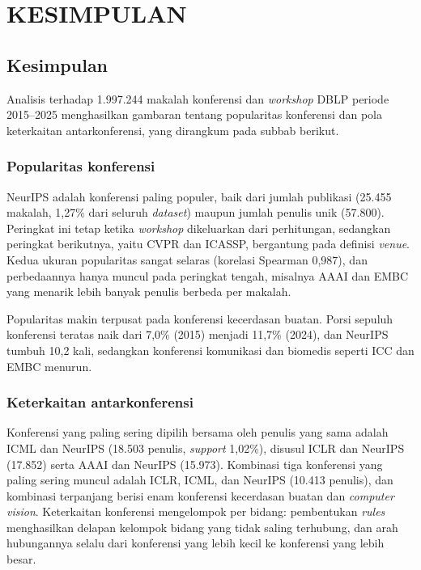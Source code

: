 \chapter{KESIMPULAN}
\label{chap:kesimpulan}

\section{Kesimpulan}
Analisis terhadap 1.997.244 makalah konferensi dan \textit{workshop} DBLP periode 2015--2025 menghasilkan gambaran tentang popularitas konferensi dan pola keterkaitan antarkonferensi, yang dirangkum pada subbab berikut.

\subsection{Popularitas konferensi}
NeurIPS adalah konferensi paling populer, baik dari jumlah publikasi (25.455 makalah, 1,27\% dari seluruh \textit{dataset}) maupun jumlah penulis unik (57.800). Peringkat ini tetap ketika \textit{workshop} dikeluarkan dari perhitungan, sedangkan peringkat berikutnya, yaitu CVPR dan ICASSP, bergantung pada definisi \textit{venue}. Kedua ukuran popularitas sangat selaras (korelasi Spearman 0,987), dan perbedaannya hanya muncul pada peringkat tengah, misalnya AAAI dan EMBC yang menarik lebih banyak penulis berbeda per makalah.

Popularitas makin terpusat pada konferensi kecerdasan buatan. Porsi sepuluh konferensi teratas naik dari 7,0\% (2015) menjadi 11,7\% (2024), dan NeurIPS tumbuh 10,2 kali, sedangkan konferensi komunikasi dan biomedis seperti ICC dan EMBC menurun.

\subsection{Keterkaitan antarkonferensi}
Konferensi yang paling sering dipilih bersama oleh penulis yang sama adalah ICML dan NeurIPS (18.503 penulis, \textit{support} 1,02\%), disusul ICLR dan NeurIPS (17.852) serta AAAI dan NeurIPS (15.973). Kombinasi tiga konferensi yang paling sering muncul adalah ICLR, ICML, dan NeurIPS (10.413 penulis), dan kombinasi terpanjang berisi enam konferensi kecerdasan buatan dan \textit{computer vision}. Keterkaitan konferensi mengelompok per bidang: pembentukan \textit{rules} menghasilkan delapan kelompok bidang yang tidak saling terhubung, dan arah hubungannya selalu dari konferensi yang lebih kecil ke konferensi yang lebih besar.


